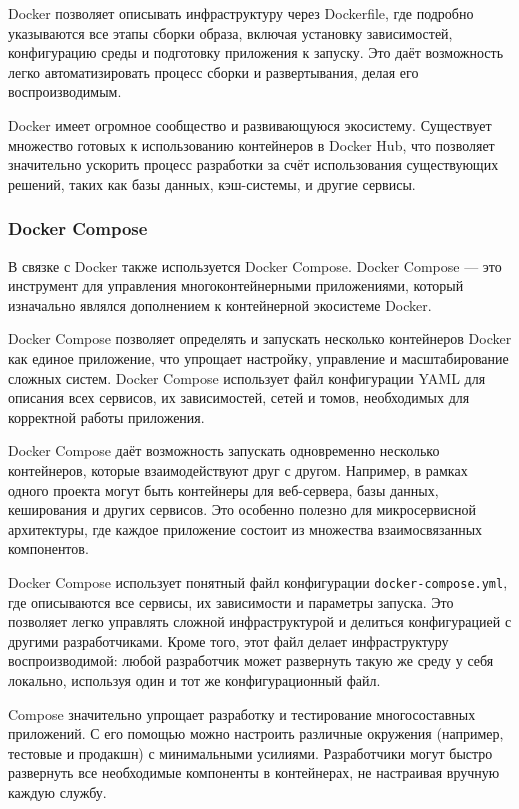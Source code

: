 \documentclass[diploma]{SCWorks}
\begin{document}
Docker позволяет описывать инфраструктуру через Dockerfile, где подробно 
указываются все этапы сборки образа, включая установку зависимостей, 
конфигурацию среды и подготовку приложения к запуску. Это даёт возможность 
легко автоматизировать процесс сборки и развертывания, делая его 
воспроизводимым.
    
Docker имеет огромное сообщество и развивающуюся экосистему. Существует 
множество готовых к использованию контейнеров в Docker Hub, что позволяет 
значительно ускорить процесс разработки за счёт использования существующих 
решений, таких как базы данных, кэш-системы, и другие сервисы.

\subsubsection{Docker Compose}

В связке с Docker также используется Docker Compose. Docker Compose — это 
инструмент для управления многоконтейнерными приложениями, который изначально
являлся дополнением к контейнерной экосистеме Docker.

Docker Compose позволяет определять и запускать несколько контейнеров Docker 
как единое приложение, что упрощает настройку, управление и масштабирование 
сложных систем. Docker Compose использует файл конфигурации YAML для описания 
всех сервисов, их зависимостей, сетей и томов, необходимых для корректной 
работы приложения.

Docker Compose даёт возможность запускать одновременно несколько контейнеров, 
которые взаимодействуют друг с другом. Например, в рамках одного проекта могут 
быть контейнеры для веб-сервера, базы данных, кеширования и других сервисов. 
Это особенно полезно для микросервисной архитектуры, где каждое приложение 
состоит из множества взаимосвязанных компонентов.
    
Docker Compose использует понятный файл конфигурации 
\texttt{docker-compose.yml}, где описываются все сервисы, их зависимости и 
параметры запуска. Это позволяет легко управлять сложной инфраструктурой и 
делиться конфигурацией с другими разработчиками. Кроме того, этот файл делает 
инфраструктуру воспроизводимой: любой разработчик может развернуть такую же 
среду у себя локально, используя один и тот же конфигурационный файл.
    
Compose значительно упрощает разработку и тестирование многосоставных 
приложений. С его помощью можно настроить различные окружения (например, 
тестовые и продакшн) с минимальными усилиями. Разработчики могут быстро 
развернуть все необходимые компоненты в контейнерах, не настраивая вручную 
каждую службу.
    
\end{document}
